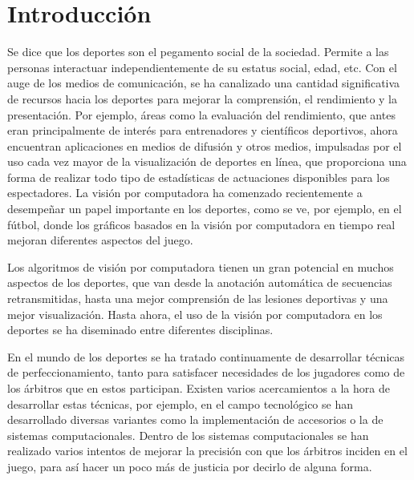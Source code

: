 \chapter*{Introducción}\label{chapter:introduction}

Se dice que los deportes son el pegamento social de la sociedad. Permite a las
personas interactuar independientemente de su estatus social, edad, etc. Con el
auge de los medios de comunicación, se ha canalizado una cantidad significativa
de recursos hacia los deportes para mejorar la comprensión, el rendimiento y la
presentación. Por ejemplo, áreas como la evaluación del rendimiento, que antes
eran principalmente de interés para entrenadores y científicos deportivos, ahora
encuentran aplicaciones en medios de difusión y otros medios, impulsadas por el
uso cada vez mayor de la visualización de deportes en línea, que proporciona una
forma de realizar todo tipo de estadísticas de actuaciones disponibles para los
espectadores. La visión por computadora ha comenzado recientemente a desempeñar
un papel importante en los deportes, como se ve, por ejemplo, en el fútbol, donde
los gráficos basados en la visión por computadora en tiempo real mejoran diferentes
aspectos del juego.

Los algoritmos de visión por computadora tienen un gran potencial en muchos aspectos
de los deportes, que van desde la anotación automática de secuencias retransmitidas,
hasta una mejor comprensión de las lesiones deportivas y una mejor visualización.
Hasta ahora, el uso de la visión por computadora en los deportes se ha diseminado
entre diferentes disciplinas.

En el mundo de los deportes se ha tratado continuamente de desarrollar técnicas
de perfeccionamiento, tanto para satisfacer necesidades de los jugadores como
de los árbitros que en estos participan. Existen varios acercamientos a la hora de
desarrollar estas técnicas, por ejemplo, en el campo tecnológico se han
desarrollado diversas variantes como la implementación de accesorios o la de
sistemas computacionales. Dentro de los sistemas computacionales se han
realizado varios intentos de mejorar la precisión con que los árbitros inciden en el
juego, para así hacer un poco más de justicia por decirlo de alguna forma.


